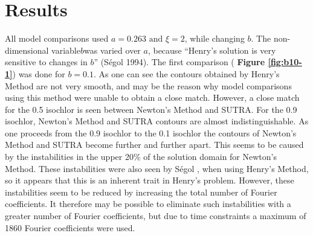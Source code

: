 \documentclass{article}
\newcommand{\spbox}[1]{ \text{ #1 }} %
\begin{document}
\section{Results}
All model comparisons used $a = 0.263 \spbox{and} \xi =2$, while changing $b$. The
non-dimensional variable$b$was varied over $a$, because ``Henry's solution is
very sensitive to changes in $b$'' (S\'egol 1994). The first comparison
( \textbf{Figure \ref{fig:b10-1}}) was done for $b=0.1$. As one can see the
contours obtained by Henry's Method are not very smooth, and may be the reason
why model comparisons using this method were unable to obtain a close match.
However, a close match for the 0.5 isochlor is seen between Newton's Method and
SUTRA. For the 0.9 isochlor, Newton's Method and SUTRA contours are almost
indistinguishable. As one proceeds from the 0.9 isochlor to the 0.1 isochlor the
contours of Newton's Method and SUTRA become further and further apart. This
seems to be caused by the instabilities in the upper 20\% of the solution domain
for Newton's Method. These instabilities were also seen by S\'egol \cite{Segol},
when using Henry's Method, so it appears that this is an inherent trait in
Henry's problem. However, these instabilities seem to be reduced by increasing
the total number of Fourier coefficients. It therefore may be possible to
eliminate such instabilities with a greater number of Fourier coefficients, but
due to time constraints a maximum of 1860 Fourier coefficients were used.
\end{document}
